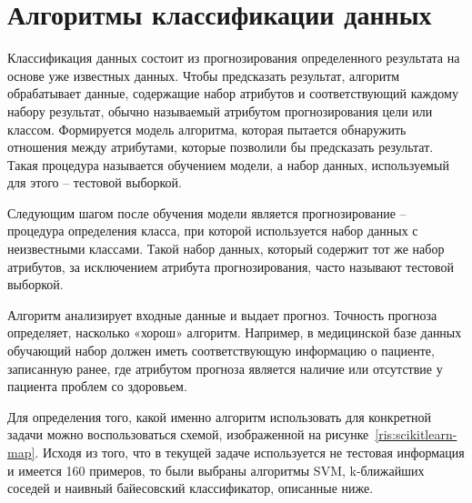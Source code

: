 \newpage
\section{\Large Алгоритмы классификации данных}
Классификация данных состоит из прогнозирования определенного результата на основе уже известных данных. Чтобы предсказать результат, алгоритм обрабатывает данные, содержащие набор атрибутов и соответствующий каждому набору результат, обычно называемый атрибутом прогнозирования цели или классом. Формируется модель алгоритма, которая пытается обнаружить отношения между атрибутами, которые позволили бы предсказать результат. Такая процедура называется обучением модели, а набор данных, используемый для этого -- тестовой выборкой.
\par
Следующим шагом после обучения модели является прогнозирование -- процедура определения класса, при которой используется набор данных с неизвестными классами. Такой набор данных, который содержит тот же набор атрибутов, за исключением атрибута прогнозирования, часто называют тестовой выборкой.
\par
Алгоритм анализирует входные данные и выдает прогноз. Точность прогноза определяет, насколько «хорош» алгоритм. Например, в медицинской базе данных обучающий набор должен иметь соответствующую информацию о пациенте, записанную ранее, где атрибутом прогноза является наличие или отсутствие у пациента проблем со здоровьем.
\par
Для определения того, какой именно алгоритм использовать для конкретной задачи можно воспользоваться схемой, изображенной на рисунке~\ref{ris:scikitlearn-map}. Исходя из того, что в текущей задаче используется не тестовая информация и имеется 160 примеров, то были выбраны алгоритмы SVM, k-ближайших соседей и наивный байесовский классификатор, описанные ниже.
\\
